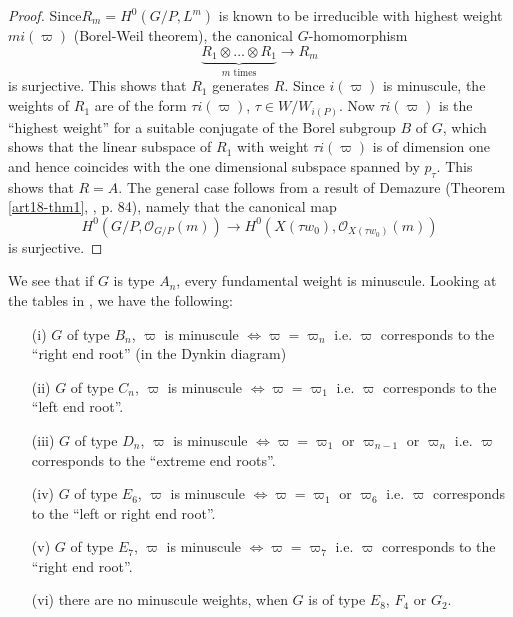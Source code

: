 \begin{proof}
Since\pageoriginale $R_m = H^0(G/P, L^m)$ is known to be irreducible with highest weight $mi(\varpi)$ (Borel-Weil theorem), the canonical $G$-homomorphism
$$
\underbrace{R_1 \otimes \ldots \otimes R_1}_{m \text{ times}} \to R_m
$$
is surjective. This shows that $R_1$ generates $R$. Since $i(\varpi)$ is minuscule, the weights of $R_1$ are of the form $\tau i (\varpi)$, $\tau \in W / W_{i(P)}$. Now $\tau i (\varpi)$ is the ``highest weight'' for a suitable conjugate of the Borel subgroup $B$ of $G$, which shows that the linear subspace of $R_1$ with weight $\tau i (\varpi)$ is of dimension one and hence coincides with the one dimensional subspace spanned by $p_\tau$. This shows that $R = A$. The general case follows from a result of Demazure  (\cf Theorem \ref{art18-thm1}, \cite{art18-key8}, p. 84), namely that the canonical map
$$
H^0(G/P, \mathscr{O}_{G/P} (m)) \to H^0(X(\tau w_0), \mathscr{O}_{X (\tau w_0)} (m))
$$
is surjective.
\end{proof}

\begin{remark}\label{art18-rem7}
We see that if $G$ is type $A_n$, every fundamental weight is minuscule. Looking at the tables in \cite{art18-key4}, we have the following:
\begin{itemize}
\item[(i)] $G$ of type $B_n$, $\varpi$ is minuscule $\Leftrightarrow \varpi = \varpi_n$ i.e. $\varpi$ corresponds to the ``right end root'' (in the Dynkin diagram)

\item[(ii)] $G$ of type $C_n$, $\varpi$ is minuscule $\Leftrightarrow \varpi = \varpi_1$ i.e. $\varpi$ corresponds to the ``left end root''.

\item[(iii)] $G$ of type $D_n$, $\varpi$ is minuscule $\Leftrightarrow \varpi = \varpi_1$ or $\varpi_{n-1}$ or $\varpi_n$ i.e. $\varpi$ corresponds to the ``extreme end roots''.

\item[(iv)] $G$ of type $E_6$, $\varpi$ is minuscule $\Leftrightarrow \varpi = \varpi_1$ or $\varpi_6$ i.e. $\varpi$ corresponds to the ``left or right end root''.

\item[(v)] $G$ of type $E_7$, $\varpi$ is minuscule $\Leftrightarrow \varpi = \varpi_7$ i.e. $\varpi$ corresponds to the ``right end root''.

\item[(vi)] there are no minuscule weights, when $G$ is of type $E_8$, $F_4$ or $G_2$.
\end{itemize}
\end{remark}

